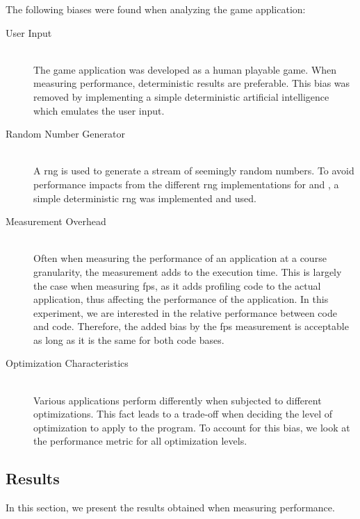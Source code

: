 The following biases were found when analyzing the game application:
\begin{description}
  \item [User Input] \hfill \\
The game application was developed as a human playable game.
When measuring performance, deterministic results are preferable.
This bias was removed by implementing a simple deterministic artificial intelligence which emulates the user input.

  \item [Random Number Generator] \hfill \\
A \gls{rng} is used to generate a stream of seemingly random numbers.
To avoid performance impacts from the different \gls{rng} implementations for {\C} and {\rust,} a simple deterministic \gls{rng} was implemented and used.

  \item [Measurement Overhead] \hfill \\
Often when measuring the performance of an application at a course granularity, the measurement adds to the execution time.
This is largely the case when measuring \gls{fps}, as it adds profiling code to the actual application, thus affecting the performance of the application.
In this experiment, we are interested in the relative performance between {\C} code and {\rust} code.
Therefore, the added bias by the \gls{fps} measurement is acceptable as long as it is the same for both code bases.

  \item [Optimization Characteristics] \hfill \\
Various applications perform differently when subjected to different optimizations.
This fact leads to a trade-off when deciding the level of optimization to apply to the program.
To account for this bias, we look at the performance metric for all optimization levels.
\end{description}

\subsection{Results}
\label{sec:perf:res}

In this section, we present the results obtained when measuring performance.

